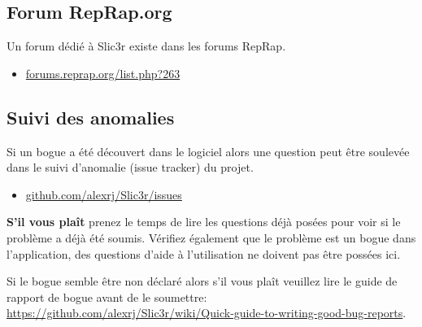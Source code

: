 
\subsection{Forum RepRap.org} %
\label{sub:reprap_org_forum}


Un forum d\'edi\'e \`a Slic3r existe dans les forums RepRap.
\begin{itemize}
    \item \url{forums.reprap.org/list.php?263}
\end{itemize}


\subsection{Suivi des anomalies} %
\label{sub:issue_tracker}

Si un bogue a \'et\'e d\'ecouvert dans le logiciel alors une question peut \^etre soulev\'ee dans le suivi d'anomalie (issue tracker) du projet.

\begin{itemize}
    \item \url{github.com/alexrj/Slic3r/issues}
\end{itemize}

\textbf{S'il vous pla\^it} prenez le temps de lire les questions d\'ej\`a pos\'ees pour voir si le probl\`eme a d\'ej\`a \'et\'e soumis. V\'erifiez \'egalement que le probl\`eme est un bogue dans l'application, des questions d'aide \`a l'utilisation ne doivent pas \^etre poss\'ees ici.

Si le bogue semble \^etre non d\'eclar\'e alors s'il vous pla\^it veuillez lire le guide de rapport de bogue avant de le soumettre: \url{https://github.com/alexrj/Slic3r/wiki/Quick-guide-to-writing-good-bug-reports}.


